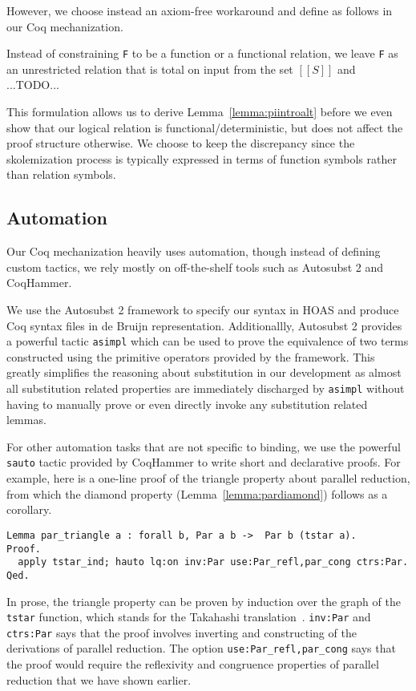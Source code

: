 \documentclass[acmsmall]{acmart}
\begin{document}
However, we choose instead an axiom-free workaround and define
 as follows in our Coq mechanization.

Instead of constraining \texttt{F} to be a function or a functional
relation, we leave \texttt{F} as an unrestricted relation that is
total on input from the set $[[S]]$ and ...TODO...

This formulation allows us to derive Lemma~\ref{lemma:piintroalt}
before we even show that our logical relation is
functional/deterministic, but does not affect the proof structure
otherwise. We choose to keep the discrepancy since the skolemization
process is typically expressed in terms of function symbols rather
than relation symbols.

\subsection{Automation}
\label{sec:automation}
Our Coq mechanization heavily uses automation, though instead of
defining custom tactics, we rely mostly on off-the-shelf tools such as
Autosubst 2 and CoqHammer.

We use the Autosubst 2 framework to specify our syntax in HOAS and
produce Coq syntax files in de Bruijn representation. Additionallly,
Autosubst 2 provides a powerful tactic \texttt{asimpl} which
can be used to prove the equivalence of two terms constructed using
the primitive operators provided by the framework. This greatly
simplifies the reasoning about substitution in our development as
almost all substitution related properties are immediately discharged
by \texttt{asimpl} without having to manually prove or even directly invoke any
substitution related lemmas.

For other automation tasks that are not specific to binding, we use
the powerful \texttt{sauto} tactic provided by CoqHammer to write
short and declarative proofs. For example, here is a one-line proof of
the triangle property about parallel reduction, from which the diamond
property (Lemma~\ref{lemma:pardiamond}) follows as a corollary.
\begin{verbatim}
Lemma par_triangle a : forall b, Par a b ->  Par b (tstar a).
Proof.
  apply tstar_ind; hauto lq:on inv:Par use:Par_refl,par_cong ctrs:Par.
Qed.
\end{verbatim}
In prose, the triangle property can be proven by induction over the
graph of the \texttt{tstar} function, which stands for the Takahashi
translation~\citep{takahashi-parallel-reduction}. \texttt{inv:Par} and
\texttt{ctrs:Par} says that the proof involves inverting and
constructing of the derivations of parallel
reduction. The option \texttt{use:Par\_refl,par\_cong} says that the proof would
require the reflexivity and congruence properties of parallel
reduction that we have shown earlier.
\end{document}
